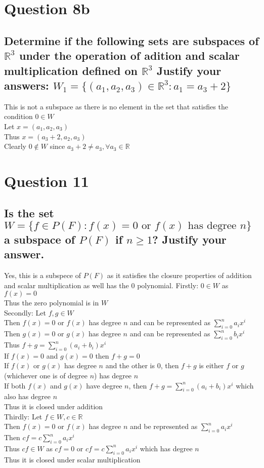\documentclass{article}
\begin{document}
\section*{Question 8b}
\subsection*{Determine if the following sets are subspaces of $\mathds{R}^3$ under the operation of adition and scalar multiplication defined on $\mathds{R}^3$ Justify your answers: $W_1 = \{(a_1, a_2,a_3) \in \mathds{R}^3: a_1 = a_3 + 2\}$}
This is not a subspace as there is no element in the set that satisfies the condition $0 \in W$\\
Let $x = (a_1,a_2,a_3)$\\
Thus $x = (a_3 + 2,a_2,a_3)$\\
Clearly $0 \notin W $ since $a_3 + 2 \neq a_3, \forall a_3 \in \mathds{R}$\\

\section*{Question 11}
\subsection*{Is the set $W = \{f \in P(F): f(x) = 0 \text{ or } f(x) \text{ has degree } n \}$ a subspace of $P(F)$ if $n \geq 1$? Justify your answer.}
Yes, this is a subspece of $P(F)$ as it satisfies the closure properties of addition and scalar multiplication as well has the 0 polynomial.
Firstly: $0 \in W$ as $f(x) = 0$\\
Thus the zero polynomial is in $W$\\
Secondly: Let $f,g \in W$\\
Then $f(x) = 0$ or $f(x)$ has degree $n$ and can be represented as $\sum_{i=0}^{n} a_i x^i$\\
Then $g(x) = 0$ or $g(x)$ has degree $n$ and can be represented as $\sum_{i=0}^{n} b_i x^i$\\
Thus $f + g = \sum_{i=0}^{n} (a_i + b_i)x^i$\\
If $f(x) = 0$ and $g(x) = 0$ then $f + g = 0$\\
If $f(x)$ or $g(x)$ has degree $n$ and the other is 0, then $f + g$ is either $f$ or $g$ (whichever one is of degree $n$) has degree $n$\\
If both $f(x)$ and $g(x)$ have degree $n$, then $f + g = \sum_{i=0}^{n} (a_i + b_i)x^i$ which also has degree $n$ \\
Thus it is closed under addition\\

Thirdly: Let $f \in W, c \in \mathds{R}$\\
Then $f(x) = 0$ or $f(x)$ has degree $n$ and be represented as $\sum_{i=0}^{n} a_i x^i$\\
Then $cf = c\sum_{i=0}^{n} a_i x^i$\\
Thus $cf \in W$ as $cf = 0$ or $cf = c\sum_{i=0}^{n} a_i x^i$ which has degree $n$\\
Thus it is closed under scalar multiplication\\
\end{document}
